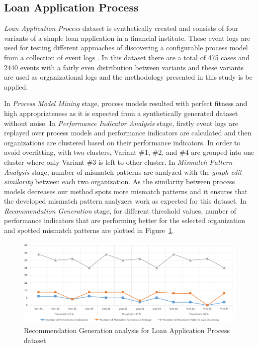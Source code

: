 \subsection{Loan Application Process}
\label{subsec:loan-app-process}
\textit{Loan Application Process} dataset is synthetically created and consists of four variants of a simple loan application in a financial institute. These event logs are used for testing different approaches of discovering a configurable process model from a collection of event logs \cite{buijs2014flexible}. In this dataset there are a total of 475 cases and 2440 events with a fairly even distribution between variants and these variants are used as organizational logs and the methodology presented in this study is be applied.

In \textit{Process Model Mining} stage, process models resulted with perfect fitness and high appropriateness as it is expected from a synthetically generated dataset without noise. In \textit{Performance Indicator Analysis} stage, firstly event logs are replayed over process models and performance indicators are calculated and then organizations are clustered based on their performance indicators. In order to avoid overfitting,  with two clusters, Variant \#1, \#2, and \#4 are grouped into one cluster where only Variant \#3 is left to other cluster. In \textit{Mismatch Pattern Analysis} stage, number of mismatch patterns are analyzed with the \textit{graph-edit similarity} between each two organization. As the similarity between process models decreases our method spots more mismatch patterns and it ensures that the developed mismatch pattern analyzers work as expected for this dataset. In \textit{Recommendation Generation} stage, for different threshold values, number of performance indicators that are performing better for the selected organization and spotted mismatch patterns are plotted in Figure~\ref{fig:loan-recommendation-generation-analysis}. 
\begin{figure}[t!]
    	\centering
    	\includegraphics[width=\textwidth]{5_results_discussions/loan-application-process/recommendation-generation-analysis}
    	\caption{Recommendation Generation analysis for Loan Application Process dataset}
      \label{fig:loan-recommendation-generation-analysis}
\end{figure}
